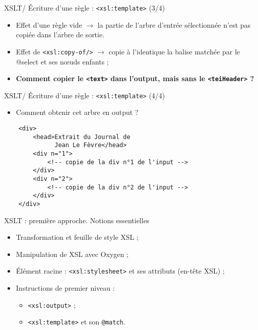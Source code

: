 \documentclass{beamer}
\begin{document}
    \begin{frame}[fragile]{XSLT/ Écriture d'une règle : \texttt{<xsl:template>} (3/4)}
        \Large
        \begin{itemize}
            \item Effet d'une règle vide $\rightarrow$ la partie de l'arbre d'entrée sélectionnée n'est pas copiée dans l'arbre de sortie.
            \bigskip
            \item Effet de \texttt{<xsl:copy-of/>} $\rightarrow$ copie à l'identique la balise matchée par
le @select et ses n\oe uds enfants ;
            \bigskip
            \item \textbf{Comment copier le \texttt{<text>} dans l'output, mais sans le \texttt{<teiHeader>} ?}
        \end{itemize}
    \end{frame}

    \begin{frame}[fragile]{XSLT/ Écriture d'une règle : \texttt{<xsl:template>} (4/4)}
    \Large
        \begin{itemize}
            \item Comment obtenir cet arbre en output ?
        \end{itemize}
        \normalsize
        \begin{verbatim}
    <div>
        <head>Extrait du Journal de
              Jean Le Fèvre</head>
        <div n="1">
            <!-- copie de la div n°1 de l'input -->
        </div>
        <div n="2">
            <!-- copie de la div n°2 de l'input -->
        </div>
    </div>
        \end{verbatim}
        
    \end{frame}

    \begin{frame}{XSLT : première approche. Notions essentielles}
        \Large
        \begin{itemize}
            \item Transformation et feuille de style XSL ;
            \bigskip
            \item Manipulation de XSL avec Oxygen ;
            \bigskip
            \item Élément racine : \texttt{<xsl:stylesheet>} et ses attributs (en-tête XSL) ;
            \bigskip
            \item Instructions de premier niveau :
            \begin{itemize}
            \Large
                \item \texttt{<xsl:output>} ;
                \item \texttt{<xsl:template>} et son \texttt{@match}.
            \end{itemize}
        \end{itemize}
    \end{frame}
\end{document}
